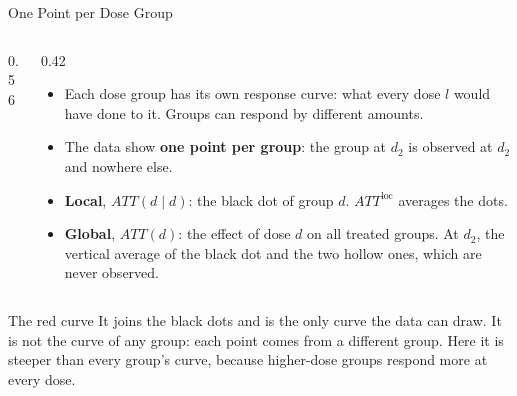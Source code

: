 \documentclass[main.tex]{subfiles}
\begin{document}
\begin{frame}{One Point per Dose Group}
\begin{columns}[T]
\begin{column}{0.56\textwidth}
    \end{column}
    \begin{column}{0.42\textwidth}
      \footnotesize
      \begin{itemize}
        \item Each dose group has its own response curve: what every dose $l$
          would have done to it. Groups can respond by different amounts.
        \item The data show \textbf{one point per group}: the group at $d_2$
          is observed at $d_2$ and nowhere else.
        \item \textbf{Local}, $ATT(d\mid d)$: the black dot of group $d$.
          $ATT^{\text{loc}}$ averages the dots.
        \item \textbf{Global}, $ATT(d)$: the effect of dose $d$ on all treated
          groups. At $d_2$, the vertical average of the black dot and the two
          hollow ones, which are never observed.
      \end{itemize}
    \end{column}
  \end{columns}

  \smallskip
  \begin{alertblock}{\footnotesize The red curve}
    \footnotesize
    It joins the black dots and is the only curve the data can draw. It is not
    the curve of any group: each point comes from a different group. Here it is
    steeper than every group's curve, because higher-dose groups respond more at
    every dose.
  \end{alertblock}

\end{frame}
\end{document}
